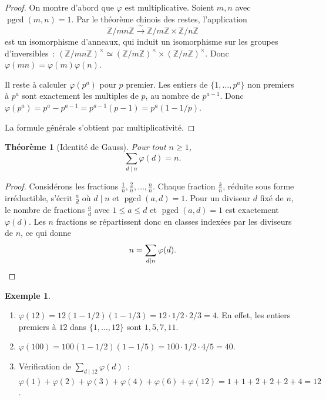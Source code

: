 \documentclass[12pt,a4paper,openany]{book}
\theoremstyle{definition}
\newtheorem{exemple}[definition]{Exemple}
\theoremstyle{plain}
\newtheorem{theoreme}[definition]{Théorème}
\theoremstyle{remark}
\newcommand{\Z}{\mathbb{Z}}
\DeclareMathOperator{\pgcd}{pgcd}
\begin{document}
\begin{proof}
On montre d'abord que $\varphi$ est multiplicative. Soient $m, n$ avec
$\pgcd(m,n) = 1$. Par le théorème chinois des restes,
l'application
\[
  \Z/mn\Z \xrightarrow{\;\sim\;} \Z/m\Z \times \Z/n\Z
\]
est un isomorphisme d'anneaux, qui induit un isomorphisme sur les groupes d'inversibles~:
$(\Z/mn\Z)^\times \simeq (\Z/m\Z)^\times \times (\Z/n\Z)^\times$. Donc
$\varphi(mn) = \varphi(m)\varphi(n)$.

Il reste à calculer $\varphi(p^a)$ pour $p$ premier. Les entiers de $\{1, \ldots, p^a\}$
non premiers à $p^a$ sont exactement les multiples de $p$, au nombre de $p^{a-1}$. Donc
$\varphi(p^a) = p^a - p^{a-1} = p^{a-1}(p-1) = p^a(1 - 1/p)$.

La formule générale s'obtient par multiplicativité.
\end{proof}

\begin{theoreme}[Identité de Gauss]
\label{thm:gauss-phi}
Pour tout $n \geq 1$,
\[
  \sum_{d \mid n} \varphi(d) = n.
\]
\end{theoreme}

\begin{proof}
Considérons les fractions $\frac{1}{n}, \frac{2}{n}, \ldots, \frac{n}{n}$. Chaque
fraction $\frac{k}{n}$, réduite sous forme irréductible, s'écrit $\frac{a}{d}$ où
$d \mid n$ et $\pgcd(a, d) = 1$. Pour un diviseur $d$ fixé de $n$, le nombre de
fractions $\frac{a}{d}$ avec $1 \leq a \leq d$ et $\pgcd(a,d) = 1$ est exactement
$\varphi(d)$. Les $n$ fractions se répartissent donc en classes indexées par les diviseurs
de $n$, ce qui donne
\[
  n = \sum_{d \mid n} \varphi(d). \qedhere
\]
\end{proof}

\begin{exemple}
\label{ex:phi-calculs}
\begin{enumerate}[label=(\alph*)]
  \item $\varphi(12) = 12(1 - 1/2)(1 - 1/3) = 12 \cdot 1/2 \cdot 2/3 = 4$.
    En effet, les entiers premiers à $12$ dans $\{1,\ldots,12\}$ sont $1, 5, 7, 11$.
  \item $\varphi(100) = 100(1-1/2)(1-1/5) = 100 \cdot 1/2 \cdot 4/5 = 40$.
  \item Vérification de $\sum_{d \mid 12} \varphi(d)$~:
    $\varphi(1) + \varphi(2) + \varphi(3) + \varphi(4) + \varphi(6) + \varphi(12)
    = 1 + 1 + 2 + 2 + 2 + 4 = 12$. \checkmark
\end{enumerate}
\end{exemple}
\end{document}
